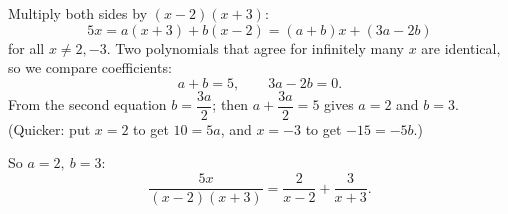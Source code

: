 Multiply both sides by $(x-2)(x+3)$:
\[
5x=a(x+3)+b(x-2)=(a+b)x+(3a-2b)
\]
for all $x\ne2,-3$. Two polynomials that agree for infinitely many $x$ are identical, so we compare coefficients:
\[
a+b=5,\qquad 3a-2b=0 .
\]
From the second equation $b=\dfrac{3a}{2}$; then $a+\dfrac{3a}{2}=5$ gives $a=2$ and $b=3$. (Quicker: put $x=2$ to get $10=5a$, and $x=-3$ to get $-15=-5b$.)

So $\boxed{a=2,\ b=3}$:
\[
\dfrac{5x}{(x-2)(x+3)}=\dfrac{2}{x-2}+\dfrac{3}{x+3}.
\]
